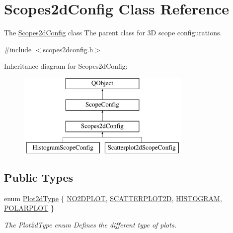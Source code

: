 \hypertarget{class_scopes2d_config}{\section{Scopes2d\-Config Class Reference}
\label{class_scopes2d_config}
}


The \hyperlink{class_scopes2d_config}{Scopes2d\-Config} class The parent class for 3\-D scope configurations.  




{\ttfamily \#include $<$scopes2dconfig.\-h$>$}

Inheritance diagram for Scopes2d\-Config\-:\begin{figure}[H]
\begin{center}
\leavevmode
\includegraphics[height=4.000000cm]{class_scopes2d_config}
\end{center}
\end{figure}
\subsection*{Public Types}
\begin{DoxyCompactItemize}
\item 
enum \hyperlink{group___scope_plugin_ga0fad4d5fa165d3cf65c53a66501eb830}{Plot2d\-Type} \{ \hyperlink{group___scope_plugin_gga0fad4d5fa165d3cf65c53a66501eb830a8a05ed744e85e763986c4c55bf561e67}{N\-O2\-D\-P\-L\-O\-T}, 
\hyperlink{group___scope_plugin_gga0fad4d5fa165d3cf65c53a66501eb830a4cc6659e6c550e7a821db4ad6d3ed4dc}{S\-C\-A\-T\-T\-E\-R\-P\-L\-O\-T2\-D}, 
\hyperlink{group___scope_plugin_gga0fad4d5fa165d3cf65c53a66501eb830a7f84951522a86b7b7a00ccc4fc58ad5a}{H\-I\-S\-T\-O\-G\-R\-A\-M}, 
\hyperlink{group___scope_plugin_gga0fad4d5fa165d3cf65c53a66501eb830a6d9b3ec0d944281832f5d0b2d474106a}{P\-O\-L\-A\-R\-P\-L\-O\-T}
 \}
\begin{DoxyCompactList}\small\item\em The Plot2d\-Type enum Defines the different type of plots. \end{DoxyCompactList}\end{DoxyCompactItemize}
